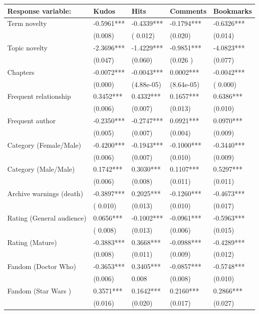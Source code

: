 \documentclass[letterpaper]{article} %
\begin{document}
 \begin{table*}
\centering
\begin{tabular}[width=0.8\textwidth]{p{4cm}p{3cm}p{3cm}p{3cm}p{3cm}}
\toprule
Response variable: & Kudos & Hits & Comments & Bookmarks \\ 
   \hline			
Term novelty & -0.5961***&  -0.4339***  & -0.1794*** & -0.6326*** \\
& (0.008) & ( 0.012) & (0.020) & (0.014)\\
Topic novelty & -2.3696*** & -1.4229*** & -0.9851*** & -4.0823*** \\
& (0.047) & (0.060) &  (0.026 ) & (0.077)\\
Chapters & -0.0072***& -0.0043*** & 0.0002***& -0.0042*** \\
& (0.000) & (4.88e-05) & (8.64e-05) & ( 0.000) \\
Frequent relationship & 0.3452*** & 0.4332*** & 0.1657*** & 0.6386***\\
& (0.006) & (0.007) & (0.013) & (0.010)\\
Frequent author & -0.2350*** & -0.2747*** & 0.0921*** & 0.0970***\\
& (0.005) & (0.007) & (0.004) & (0.009)\\
Category (Female/Male) & -0.4200*** & -0.1943*** & -0.1000*** & -0.3440***\\
& (0.006) & (0.007) & (0.010) & (0.009)\\
Category (Male/Male) & 0.1742*** & 0.3030*** & 0.1107*** & 0.5297***\\
& (0.006) & (0.008) & (0.011) & (0.011)\\
Archive warnings (death) & -0.3897*** & 0.2025*** & -0.1260*** & -0.4673***\\
& ( 0.010) & (0.013) & (0.010) & (0.017)\\
Rating (General audience) & 0.0656*** & -0.1002*** & -0.0961*** & -0.5963***\\
& ( 0.008) & (0.013) & (0.006) & (0.015)\\
Rating (Mature) & -0.3883*** & 0.3668*** & -0.0988*** & -0.4289***\\
& (0.008) & (0.011) & (0.009) & (0.012)\\
Fandom (Doctor Who) & -0.3653*** & 0.3405*** & -0.0857*** & -0.5748***\\
& (0.006) & 0.008 & (0.008) & (0.010)\\
Fandom (Star Wars ) & 0.3571*** & 0.1642*** & 0.2160*** & 0.2866***\\
& (0.016) & (0.020) & (0.017) & (0.027)\\

\end{tabular}
\end{table*}
\end{document}
